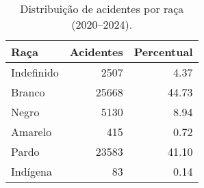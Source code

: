\begin{table}
\caption{Distribuição de acidentes por raça (2020–2024).}
\begin{tabular}{lrr}
\toprule
Raça & Acidentes & Percentual \\
\midrule
Indefinido & 2507 & 4.37 \\
Branco & 25668 & 44.73 \\
Negro & 5130 & 8.94 \\
Amarelo & 415 & 0.72 \\
Pardo & 23583 & 41.10 \\
Indígena & 83 & 0.14 \\
\bottomrule
\end{tabular}
\end{table}
